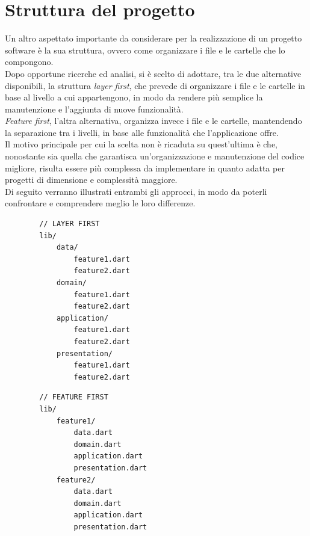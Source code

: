 \section{Struttura del progetto}
\label{sec:struttura-progetto}
Un altro aspettato importante da considerare per la realizzazione di un progetto software è la sua struttura, ovvero come organizzare i file e le cartelle che lo compongono.\\
Dopo opportune ricerche ed analisi, si è scelto di adottare, tra le due alternative disponibili, la struttura \emph{layer first}, che prevede di organizzare i file e le cartelle in base al livello a cui appartengono, in modo da rendere più semplice la manutenzione e l'aggiunta di nuove funzionalità.\\
\emph{Feature first}, l'altra alternativa, organizza invece i file e le cartelle, mantendendo la separazione tra i livelli, in base alle funzionalità che l'applicazione offre.\\
Il motivo principale per cui la scelta non è ricaduta su quest'ultima è che, nonostante sia quella che garantisca un'organizzazione e manutenzione del codice migliore, risulta essere più complessa da implementare in quanto adatta per progetti di dimensione e complessità maggiore.\\
Di seguito verranno illustrati entrambi gli approcci, in modo da poterli confrontare e comprendere meglio le loro differenze\cite{site:project-structure}.\\
\begin{multicols}{2}
    \begin{verbatim}
        // LAYER FIRST
        lib/
            data/
                feature1.dart
                feature2.dart
            domain/
                feature1.dart
                feature2.dart
            application/
                feature1.dart
                feature2.dart
            presentation/
                feature1.dart
                feature2.dart
    \end{verbatim}
    \begin{verbatim}
        // FEATURE FIRST
        lib/
            feature1/
                data.dart
                domain.dart
                application.dart
                presentation.dart
            feature2/
                data.dart
                domain.dart
                application.dart
                presentation.dart
    \end{verbatim}
\end{multicols}

